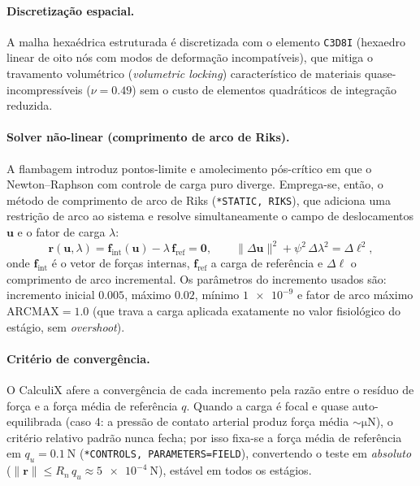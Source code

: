 \paragraph{Discretização espacial.} A malha hexaédrica estruturada é discretizada
com o elemento \texttt{C3D8I} (hexaedro linear de oito nós com modos de
deformação incompatíveis), que mitiga o travamento volumétrico
(\emph{volumetric locking}) característico de materiais quase-incompressíveis
($\nu = 0.49$) sem o custo de elementos quadráticos de integração reduzida.

\paragraph{Solver não-linear (comprimento de arco de Riks).} A flambagem
introduz pontos-limite e amolecimento pós-crítico em que o Newton--Raphson com
controle de carga puro diverge. Emprega-se, então, o método de comprimento de
arco de Riks (\texttt{*STATIC, RIKS}), que adiciona uma restrição de arco ao
sistema e resolve simultaneamente o campo de deslocamentos $\mathbf{u}$ e o fator
de carga $\lambda$:
\begin{equation}
  \mathbf{r}(\mathbf{u},\lambda)
  = \mathbf{f}_{\mathrm{int}}(\mathbf{u}) - \lambda\,\mathbf{f}_{\mathrm{ref}}
  = \mathbf{0},
  \qquad
  \lVert \Delta\mathbf{u}\rVert^2 + \psi^2\,\Delta\lambda^2 = \Delta\ell^2,
  \label{eq:riks}
\end{equation}
onde $\mathbf{f}_{\mathrm{int}}$ é o vetor de forças internas,
$\mathbf{f}_{\mathrm{ref}}$ a carga de referência e $\Delta\ell$ o comprimento de
arco incremental. Os parâmetros do incremento usados são: incremento inicial
$0.005$, máximo $0.02$, mínimo $\num{1e-9}$ e fator de arco máximo
$\mathrm{ARCMAX} = 1.0$ (que trava a carga aplicada exatamente no valor
fisiológico do estágio, sem \emph{overshoot}).

\paragraph{Critério de convergência.} O CalculiX afere a convergência de cada
incremento pela razão entre o resíduo de força e a força média de referência
$q$. Quando a carga é focal e quase auto-equilibrada (caso 4: a pressão de
contato arterial produz força média $\sim\si{\micro\newton}$), o critério
relativo padrão nunca fecha; por isso fixa-se a força média de referência em
$q_u = \SI{0.1}{\newton}$ (\texttt{*CONTROLS, PARAMETERS=FIELD}), convertendo o
teste em \emph{absoluto} ($\lVert\mathbf{r}\rVert \le R_n\,q_u
\approx \SI{5e-4}{\newton}$), estável em todos os estágios.


